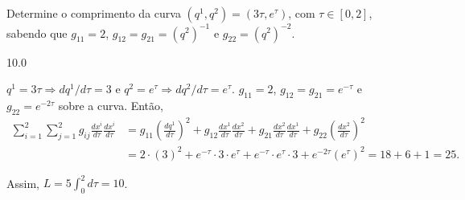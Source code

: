 \begin{question}
    Determine o comprimento da curva $(q^1, q^2) = (3\tau, e^{\tau})$, com $\tau \in [0,2]$, sabendo que $g_{11} = 2$, $g_{12} = g_{21} = (q^2)^{-1}$ e $g_{22} = (q^2)^{-2}$.

    \begin{answer}
      10.0
    \end{answer}

    \begin{solution}
      $q^1 = 3\tau \Rightarrow dq^1/d\tau = 3$ e $q^2 = e^\tau \Rightarrow dq^2/d\tau = e^\tau$.
      $g_{11} = 2$, $g_{12} = g_{21} = e^{-\tau}$ e $g_{22} = e^{-2\tau}$ sobre a curva.
      Então,
      \begin{align*}
        \sum_{i=1}^2\sum_{j=1}^2 g_{ij} \frac{dx^i}{d\tau} \frac{dx^i}{d\tau} &=
          g_{11} \left(\frac{dq^1}{d\tau}\right)^2 + g_{12} \frac{dx^1}{d\tau} \frac{dx^2}{d\tau} + g_{21} \frac{dx^2}{d\tau} \frac{dx^1}{d\tau} +  g_{22} \left(\frac{dx^2}{d\tau}\right)^2 \\
          &= 2 \cdot (3)^2 + e^{-\tau} \cdot 3 \cdot e^\tau + e^{-\tau} \cdot e^\tau \cdot 3 + e^{-2\tau} \left(e^{\tau}\right)^2
           = 18 + 6 + 1 = 25.
      \end{align*}

      Assim, $L = 5 \int_0^2 d\tau  =10$.
    \end{solution}
\end{question}